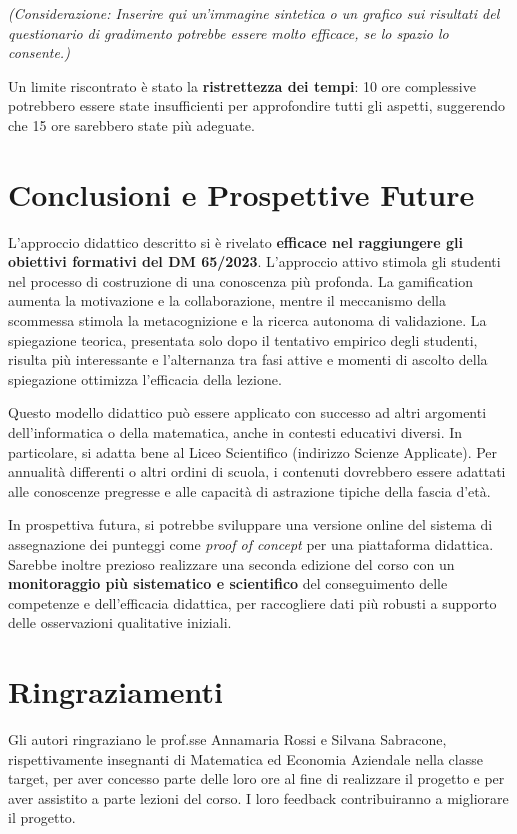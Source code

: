 \documentclass[withtimes]{easychair}
\begin{document}
\emph{(Considerazione: Inserire qui un'immagine sintetica o un grafico
sui risultati del questionario di gradimento potrebbe essere molto
efficace, se lo spazio lo consente.)}

Un limite riscontrato è stato la \textbf{ristrettezza dei tempi}: 10 ore
complessive potrebbero essere state insufficienti per approfondire tutti
gli aspetti, suggerendo che 15 ore sarebbero state più adeguate.

\section{Conclusioni e Prospettive
Future}\label{conclusioni-e-prospettive-future}

L'approccio didattico descritto si è rivelato \textbf{efficace nel
raggiungere gli obiettivi formativi del DM 65/2023}. L'approccio attivo
stimola gli studenti nel processo di costruzione di una conoscenza più
profonda. La gamification aumenta la motivazione e la collaborazione,
mentre il meccanismo della scommessa stimola la metacognizione e la
ricerca autonoma di validazione. La spiegazione teorica, presentata solo
dopo il tentativo empirico degli studenti, risulta più interessante e
l'alternanza tra fasi attive e momenti di ascolto della spiegazione
ottimizza l'efficacia della lezione.

Questo modello didattico può essere applicato con successo ad altri
argomenti dell'informatica o della matematica, anche in contesti
educativi diversi. In particolare, si adatta bene al Liceo Scientifico
(indirizzo Scienze Applicate). Per annualità differenti o altri ordini
di scuola, i contenuti dovrebbero essere adattati alle conoscenze
pregresse e alle capacità di astrazione tipiche della fascia d'età.

In prospettiva futura, si potrebbe sviluppare una versione online del
sistema di assegnazione dei punteggi come \emph{proof of concept} per
una piattaforma didattica. Sarebbe inoltre prezioso realizzare una
seconda edizione del corso con un \textbf{monitoraggio più sistematico e
scientifico} del conseguimento delle competenze e dell'efficacia
didattica, per raccogliere dati più robusti a supporto delle
osservazioni qualitative iniziali.

\section*{Ringraziamenti}
\label{sect:ringraziamenti}

Gli autori ringraziano le prof.sse Annamaria Rossi e Silvana Sabracone, rispettivamente insegnanti di Matematica ed Economia Aziendale nella classe target, per aver concesso parte delle loro ore al fine di realizzare il progetto e per aver assistito a parte lezioni del corso. I loro feedback contribuiranno a migliorare il progetto. 

\label{sect:bib}
%
%
\printbibliography
\end{document}
